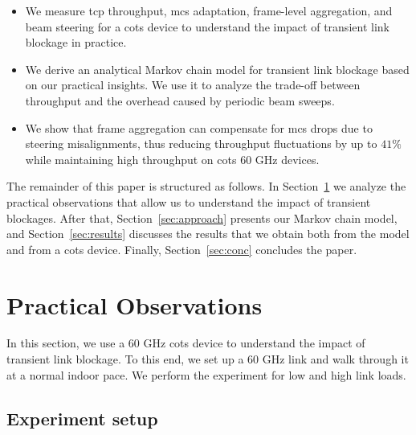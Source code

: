 \documentclass{article}
\begin{document}
\begin{itemize}

	\item We measure \ac{tcp} throughput, \ac{mcs} adaptation, frame-level aggregation, and beam steering for a \ac{cots} device to understand the impact of transient link blockage in practice.
	\item We derive an analytical Markov chain model for transient link blockage based on our practical insights. We use it to analyze the trade-off between throughput and the overhead caused by periodic beam sweeps.	
	\item We show that frame aggregation can compensate for \ac{mcs} drops due to steering misalignments, thus reducing throughput fluctuations by up to $41\%$ while maintaining high throughput on \ac{cots} 60 GHz devices.
\end{itemize}

The remainder of this paper is structured as follows. In Section~\ref{sec:problem} we analyze the practical observations that allow us to understand the impact of transient blockages. After that, Section~\ref{sec:approach} presents our Markov chain model, and Section~\ref{sec:results} discusses the results that we obtain both from the model and from a \ac{cots} device. Finally, Section~\ref{sec:conc} concludes the paper.



\section{Practical Observations}
\label{sec:problem}

In this section, we use a 60 GHz \ac{cots} device to understand the impact of transient link blockage. To this end, we set up a 60 GHz link and walk through it at a normal indoor pace. We perform the experiment for low and high link loads.

\subsection{Experiment setup}
\label{subsec:observations}
\end{document}
